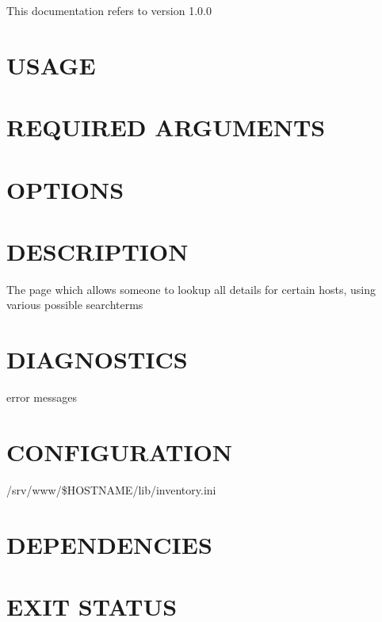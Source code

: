 \documentclass{book}
\begin{document}
This documentation refers to version 1.0.0


\section{USAGE}
\label{_USAGE}
\hypertarget{_USAGE}{}


\section{REQUIRED ARGUMENTS}
\label{_REQUIRED_ARGUMENTS}
\hypertarget{_REQUIRED_ARGUMENTS}{}


\section{OPTIONS}
\label{_OPTIONS}
\hypertarget{_OPTIONS}{}


\section{DESCRIPTION}
\label{_DESCRIPTION}
\hypertarget{_DESCRIPTION}{}



The page which allows someone to lookup all details for certain hosts, using various possible searchterms


\section{DIAGNOSTICS}
\label{_DIAGNOSTICS}
\hypertarget{_DIAGNOSTICS}{}



error messages


\section{CONFIGURATION}
\label{_CONFIGURATION}
\hypertarget{_CONFIGURATION}{}



/srv/www/\$HOSTNAME/lib/inventory.ini


\section{DEPENDENCIES}
\label{_DEPENDENCIES}
\hypertarget{_DEPENDENCIES}{}


\section{EXIT STATUS}
\label{_EXIT_STATUS}
\hypertarget{_EXIT_STATUS}{}
\end{document}
